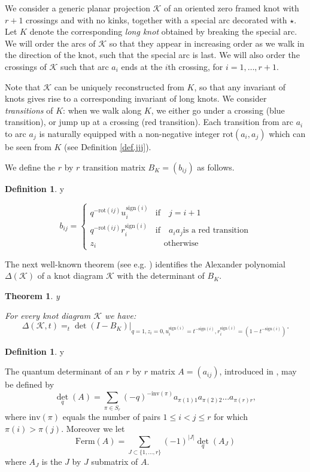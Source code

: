 \documentclass{amsart}
\theoremstyle{plain}
\newtheorem{theorem}{Theorem}
\theoremstyle{definition}
\newtheorem{definition}[proposition]{Definition}
\theoremstyle{remark}
\def\printname#1{
        \if\draft y
                \smash{\makebox[0pt]{\hspace{-0.5in}
                        \raisebox{8pt}{\tt\tiny #1}}}
        \fi
}
\def\lbl#1{\label{#1}\printname{#1}}
\def\D{\Delta}
\def\K{\mathcal K}
\def\inv{\mathrm{inv}}
\def\rot{\mathrm{rot}}
\def\sign{\mathrm{sign}}
\def\Ferm{\mathrm{Ferm}}
\begin{document}
We consider a generic planar projection $\K$ of an oriented zero framed knot 
with $r+1$ crossings and with no kinks, together with a special arc decorated
 with $\star$. Let $K$ denote the corresponding {\em long knot} obtained by 
breaking the special arc. We will order the arcs of $\K$ so that they appear
in increasing order as we walk in the direction of the knot, such that
the special arc is last. We will also order the crossings of $\K$
such that arc $a_i$ ends at the $i$th crossing, for $i=1,\dots,r+1$.

Note that $\K$ can be uniquely reconstructed from $K$, so that any invariant
of knots gives rise to a corresponding invariant of long knots.
We consider {\em transitions} of $K$: when we walk along $K$, 
we either go under a crossing (blue transition), or jump up at a crossing
(red transition). Each transition from arc $a_i$ to arc $a_j$
is naturally equipped with a non-negative integer $\rot(a_i,a_j)$ which
can be seen from $K$ (see Definition \ref{def.jjj}).

We define the $r$ by $r$ transition matrix $B_K= (b_{ij})$ as follows.

\begin{definition}
\lbl{def.transm}
$$
b_{ij}=
\begin{cases}
q^{-\rot(ij)}u^{\sign(i)}_i & \text{if} \quad j=i+1 \\
q^{-\rot(ij)}r^{\sign(i)}_i & \text{if} \quad a_ia_j 
 \text{is a red transition} \\
z_i & \quad \text{otherwise}
\end{cases}
$$
\end{definition}
 
The next well-known theorem (see e.g. \cite{BG}) identifies the Alexander 
polynomial $\D(\K)$ 
of a knot diagram $\K$ with the determinant of $B_K$.

\begin{theorem}
\lbl{thm.al}
For every knot diagram $\K$ we have:
$$
\D(\K, t)=_t \det(I-B_K)|_{q=1, z_i=0,
u^{\sign(i)}_i=t^{-\sign(i)}, r^{\sign(i)}_i=(1-t^{-\sign(i)})}.
$$
\end{theorem}

\begin{definition}
\lbl{def.ferm}
The quantum determinant of an $r$ by $r$ matrix $A= (a_{ij})$, introduced 
in \cite{FRT},
 may be defined by
$$
\det_q(A)=\sum_{\pi\in S_r} (-q)^{-\inv(\pi)}a_{\pi(1)1}a_{\pi(2)2}\dots 
a_{\pi(r)r},
$$
where $\inv(\pi)$ equals the number of pairs $1\leq i<j \leq r$ for which 
$\pi(i)>\pi(j)$.
Moreover we let
$$
\Ferm(A)= \sum_{J\subset \{1,\dots, r\}} (-1)^{|J|}\det_q(A_J)
$$
where $A_J$ is the $J$ by $J$ submatrix of $A$.
\end{definition}
\end{document}
